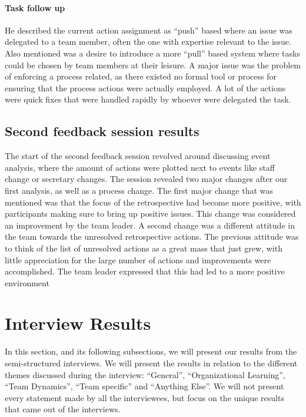 \paragraph{Task follow up}
He described the current action assignment as ``push'' based where an issue was delegated to a team member, often the one with expertise relevant to the issue. Also mentioned was a desire to introduce a more ``pull'' based system where tasks could be chosen by team members at their leisure. A major issue was the problem of enforcing a process related, as there existed no formal tool or process for ensuring that the process actions were actually employed. A lot of the actions were quick fixes that were handled rapidly by whoever were delegated the task.
\clearpage

\subsection{Second feedback session results}
The start of the second feedback session revolved around discussing event analysis, where the amount of actions were plotted next to events like staff change or secretary changes.  The session revealed two major changes after our first analysis, as well as a process change. The first major change that was mentioned was that the focus of the retrospective had become more positive, with participants making sure to bring up positive issues. This change was considered an improvement by the team leader. A second change was a different attitude in the team towards the unresolved retrospective actions.  The previous attitude was to think of the list of unresolved actions as a great mass that just grew, with little appreciation for the large number of actions and improvements were accomplished. The team leader expressed that this had led to a more positive environment 
\label{second-feedback-results}


\section{Interview Results}
In this section, and its following subsections, we will present our results from the semi-structured interviews. We will present the results in relation to the different themes discussed during the interview: ``General'', ``Organizational Learning'', ``Team Dynamics'', ``Team specific'' and ``Anything Else''. We will not present every statement made by all the interviewees, but focus on the unique results that came out of the interviews. 

